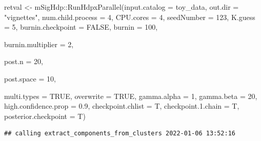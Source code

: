 \documentclass[
]{article}
\newenvironment{Shaded}{\begin{snugshade}}{\end{snugshade}}
\newcommand{\AttributeTok}[1]{\textcolor[rgb]{0.77,0.63,0.00}{#1}}
\newcommand{\ConstantTok}[1]{\textcolor[rgb]{0.00,0.00,0.00}{#1}}
\newcommand{\DecValTok}[1]{\textcolor[rgb]{0.00,0.00,0.81}{#1}}
\newcommand{\FloatTok}[1]{\textcolor[rgb]{0.00,0.00,0.81}{#1}}
\newcommand{\FunctionTok}[1]{\textcolor[rgb]{0.00,0.00,0.00}{#1}}
\newcommand{\NormalTok}[1]{#1}
\newcommand{\OtherTok}[1]{\textcolor[rgb]{0.56,0.35,0.01}{#1}}
\newcommand{\SpecialCharTok}[1]{\textcolor[rgb]{0.00,0.00,0.00}{#1}}
\newcommand{\StringTok}[1]{\textcolor[rgb]{0.31,0.60,0.02}{#1}}
\begin{document}
\begin{Shaded}
\begin{Highlighting}[]
\NormalTok{retval }\OtherTok{\textless{}{-}}\NormalTok{ mSigHdp}\SpecialCharTok{::}\FunctionTok{RunHdpxParallel}\NormalTok{(}\AttributeTok{input.catalog =}\NormalTok{ toy\_data,}
                          \AttributeTok{out.dir                  =} \StringTok{"vignettes"}\NormalTok{,}
                          \AttributeTok{num.child.process        =} \DecValTok{4}\NormalTok{, }
                          \AttributeTok{CPU.cores                =} \DecValTok{4}\NormalTok{,}
                          \AttributeTok{seedNumber               =} \DecValTok{123}\NormalTok{,}
                          \AttributeTok{K.guess                  =} \DecValTok{5}\NormalTok{,}
                          \AttributeTok{burnin.checkpoint        =} \ConstantTok{FALSE}\NormalTok{,}
                          \AttributeTok{burnin                   =} \DecValTok{100}\NormalTok{, }
                          
                          \AttributeTok{burnin.multiplier        =} \DecValTok{2}\NormalTok{,}
                         
                          \AttributeTok{post.n                   =} \DecValTok{20}\NormalTok{, }
                          
                          \AttributeTok{post.space               =} \DecValTok{10}\NormalTok{, }
                          
                          \AttributeTok{multi.types              =} \ConstantTok{TRUE}\NormalTok{,}
                          \AttributeTok{overwrite                =} \ConstantTok{TRUE}\NormalTok{,}
                          \AttributeTok{gamma.alpha              =} \DecValTok{1}\NormalTok{,}
                          \AttributeTok{gamma.beta               =} \DecValTok{20}\NormalTok{, }
                          \AttributeTok{high.confidence.prop     =} \FloatTok{0.9}\NormalTok{,}
                          \AttributeTok{checkpoint.chlist        =}\NormalTok{ T,}
                          \AttributeTok{checkpoint.1.chain       =}\NormalTok{ T,}
                          \AttributeTok{posterior.checkpoint     =}\NormalTok{ T) }
\end{Highlighting}
\end{Shaded}

\begin{verbatim}
## calling extract_components_from_clusters 2022-01-06 13:52:16
\end{verbatim}
\end{document}
